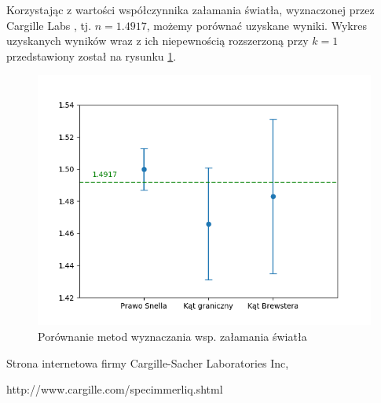 \documentclass[a4paper]{article}
\begin{document}
Korzystając z wartości współczynnika załamania światła, wyznaczonej przez Cargille Labs \cite{cargille}, tj. $n = 1.4917$, możemy porównać uzyskane wyniki.
Wykres uzyskanych wyników wraz z ich niepewnością rozszerzoną przy $k = 1$ przedstawiony został na rysunku \ref{wnioski-wykres}.

\begin{figure}
\centering
\includegraphics[scale=0.7]{wnioski.png}	
\caption{Porównanie metod wyznaczania wsp. załamania światła}
\label{wnioski-wykres}
\end{figure}




\begin{thebibliography}{9}

  Strona internetowa firmy Cargille-Sacher Laboratories Inc,
  
  http://www.cargille.com/specimmerliq.shtml


\end{thebibliography}
\end{document}
